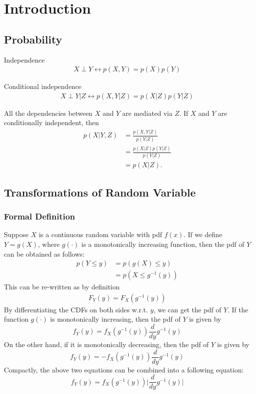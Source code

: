 \chapter{Introduction}
\section{Probability}



\begin{definition}{Independence}
	\begin{align*}
		X\perp Y \leftrightarrow p(X,Y)=p(X)p(Y)
	\end{align*}
\end{definition}
\begin{definition}{Conditional independence}
	\begin{align*}
		X\perp Y|Z \leftrightarrow p(X,Y|Z)=p(X|Z)p(Y|Z)
	\end{align*}
\end{definition}
All the dependencies between $X$ and $Y$ are mediated via $Z$. If $X$ and $Y$ are conditionally independent, then 
\begin{align*}
	p(X|Y,Z)&=\frac{p(X,Y|Z)}{p(Y|Z)}\\
	&=\frac{p(X|Z)p(Y|Z)}{p(Y|Z)}\\
	&=p(X|Z).
\end{align*}

\section{Transformations of Random Variable}
\subsection{Formal Definition}
Suppose $X$ is a continuous random variable with pdf $f(x)$. If we define $Y=g(X)$, where $g(\cdot)$ is a monotonically increasing function, then the pdf of $Y$ can be obtained as follows:
\begin{align*}
	p(Y\leq y) &= p(g(X)\leq y)\\
	& = p(X\leq g^{-1}(y))
\end{align*}
This can be re-written as by definition
\begin{align*}
F_Y(y) = F_X(g^{-1}(y))
\end{align*}
By differentiating the CDFs on both sides w.r.t. $y$, we can get the pdf of $Y$. If the function $g(\cdot)$ is monotonically increasing, then the pdf of $Y$ is given by
$$f_Y(y) = f_X(g^{-1}(y))\frac{d}{dy}g^{-1}(y)$$
On the other hand, if it is monotonically decreasing, then the pdf of $Y$ is given by
$$f_Y(y) = - f_X(g^{-1}(y))\frac{d}{dy}g^{-1}(y)$$
Compactly, the above two equations can be combined into a following equation:
$$f_Y(y) = f_X(g^{-1}(y))\Bigg|\frac{d}{dy}g^{-1}(y)\Bigg|$$

